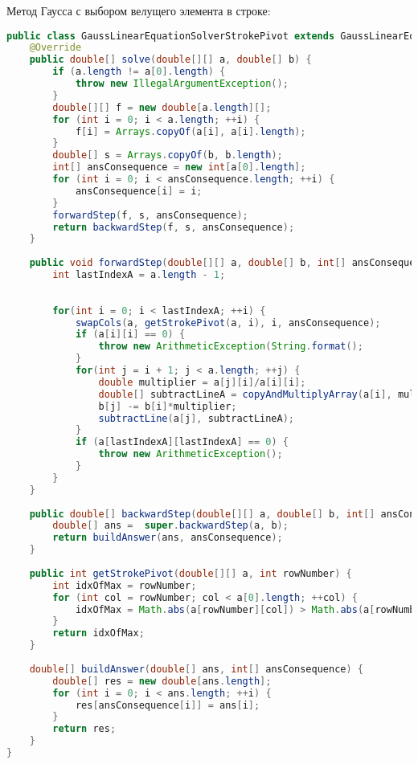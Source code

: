 \documentclass[14pt, a4paper]{extarticle}
\begin{document}
	Метод Гаусса с выбором велущего элемента в строке:		
\begin{lstlisting}[language=java]
public class GaussLinearEquationSolverStrokePivot extends GaussLinearEquationSolver {
	@Override
	public double[] solve(double[][] a, double[] b) {
		if (a.length != a[0].length) {
			throw new IllegalArgumentException();
		}
		double[][] f = new double[a.length][];
		for (int i = 0; i < a.length; ++i) {
			f[i] = Arrays.copyOf(a[i], a[i].length);
		}
		double[] s = Arrays.copyOf(b, b.length);
		int[] ansConsequence = new int[a[0].length];
		for (int i = 0; i < ansConsequence.length; ++i) {
			ansConsequence[i] = i;
		}
		forwardStep(f, s, ansConsequence);
		return backwardStep(f, s, ansConsequence);
	}
	
	public void forwardStep(double[][] a, double[] b, int[] ansConsequence) {
		int lastIndexA = a.length - 1;
		
		
		for(int i = 0; i < lastIndexA; ++i) {
			swapCols(a, getStrokePivot(a, i), i, ansConsequence);
			if (a[i][i] == 0) {
				throw new ArithmeticException(String.format();
			}
			for(int j = i + 1; j < a.length; ++j) {
				double multiplier = a[j][i]/a[i][i];
				double[] subtractLineA = copyAndMultiplyArray(a[i], multiplier);
				b[j] -= b[i]*multiplier;
				subtractLine(a[j], subtractLineA);
			}
			if (a[lastIndexA][lastIndexA] == 0) {
				throw new ArithmeticException();
			}
		}
	}
	
	public double[] backwardStep(double[][] a, double[] b, int[] ansConsequence) {
		double[] ans =  super.backwardStep(a, b);
		return buildAnswer(ans, ansConsequence);
	}
	
	public int getStrokePivot(double[][] a, int rowNumber) {
		int idxOfMax = rowNumber;
		for (int col = rowNumber; col < a[0].length; ++col) {
			idxOfMax = Math.abs(a[rowNumber][col]) > Math.abs(a[rowNumber][idxOfMax]) ? col : idxOfMax;
		}
		return idxOfMax;
	}
	
	double[] buildAnswer(double[] ans, int[] ansConsequence) {
		double[] res = new double[ans.length];
		for (int i = 0; i < ans.length; ++i) {
			res[ansConsequence[i]] = ans[i];
		}
		return res;
	}
}
\end{lstlisting}
\end{document}
